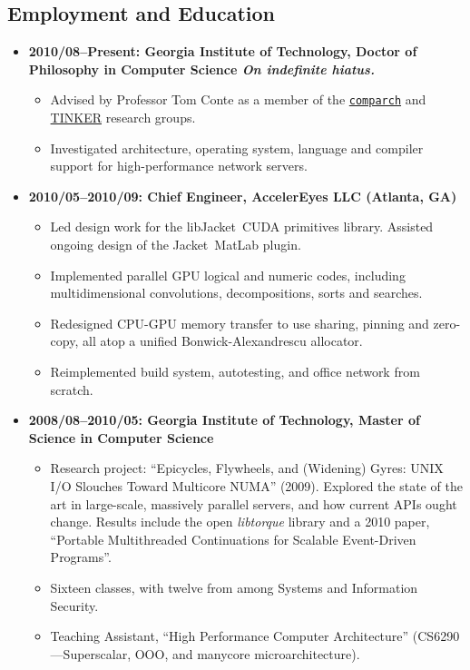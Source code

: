 \documentclass{article}
\newenvironment{tightitemize}
{\begin{itemize}
  \setlength{\itemsep}{1pt}
  \setlength{\parskip}{0pt}
  \setlength{\parsep}{0pt}}
{\end{itemize}}
\begin{document}
\subsection*{Employment and Education}
\begin{tightitemize}
\item \textbf{2010/08--Present: Georgia Institute of Technology,
Doctor of Philosophy in Computer Science
\hfill \tiny\textit{On indefinite hiatus.}}
\footnotesize
\begin{tightitemize}
\item Advised by Professor Tom Conte as a member of the \href{http://comparch.gatech.edu/}{\texttt{comparch}} and \href{http://tinker.cc.gatech.edu/}{TINKER} research groups.
\item Investigated architecture, operating system, language and compiler support for high-performance network servers.\\
\end{tightitemize}

\item \textbf{2010/05--2010/09: Chief Engineer, AccelerEyes LLC (Atlanta, GA)}
\begin{tightitemize}
\item Led design work for the libJacket\texttrademark\ CUDA primitives library. Assisted ongoing design of the Jacket\texttrademark\ MatLab\textsuperscript{\textregistered} plugin.
\item Implemented parallel GPU logical and numeric codes, including multidimensional convolutions, decompositions, sorts and searches.
\item Redesigned CPU-GPU memory transfer to use sharing, pinning and zero-copy, all atop a unified Bonwick-Alexandrescu allocator.
\item Reimplemented build system, autotesting, and office network from scratch.\\
\end{tightitemize}

\item \textbf{2008/08--2010/05: Georgia Institute of Technology, Master of Science in Computer Science}
\begin{tightitemize}
\item Research project: ``Epicycles, Flywheels, and (Widening) Gyres: UNIX I/O
  Slouches Toward Multicore NUMA'' (2009). Explored the state of the art in
  large-scale, massively parallel servers, and how current APIs ought
  change. Results include the open \textit{libtorque} library and a 2010 paper,
  ``Portable Multithreaded Continuations for Scalable Event-Driven Programs''.
\item Sixteen classes, with twelve from among Systems and Information Security.
\item Teaching Assistant, ``High Performance Computer Architecture'' (CS6290---Superscalar, OOO, and manycore microarchitecture).\\
\end{tightitemize}


\end{tightitemize}
\end{document}
